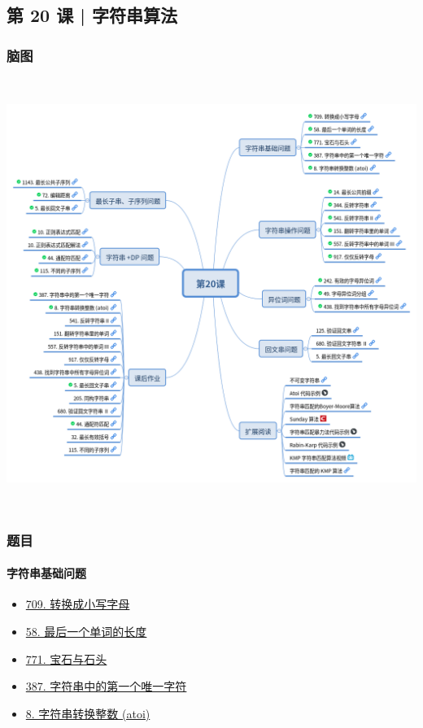 \subsection{第 20 课 | 字符串算法}

\subsubsection{脑图}

\includegraphics[width=150mm,height=140mm]{images/camp/第20课.png}

\subsubsection{题目}

\paragraph{字符串基础问题}

\begin{itemize}
  \item \hyperref[leetcode:709]{709. 转换成小写字母}
  \item \hyperref[leetcode:58]{58. 最后一个单词的长度}
  \item \hyperref[leetcode:771]{771. 宝石与石头}
  \item \hyperref[leetcode:387]{387. 字符串中的第一个唯一字符}
  \item \hyperref[leetcode:8]{8. 字符串转换整数 (atoi)}
\end{itemize}

